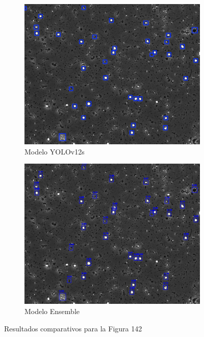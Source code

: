 \documentclass[12pt,a4paper,onecolumn,oneside]{report}
\begin{document}
\begin{figure}[H]
  \vspace{0.3cm} 
  
  \begin{subfigure}[b]{0.48\textwidth}
    \centering
    \includegraphics[width=\textwidth]{figuras/evaluacion_cualitativa/142/142_v12.jpg}
    \caption{Modelo YOLOv12s}
    \label{fig:yolov12s_image_142}
  \end{subfigure}
  \hfill
  \begin{subfigure}[b]{0.48\textwidth}
    \centering
    \includegraphics[width=\textwidth]{figuras/evaluacion_cualitativa/142/142_ensemble.jpg}
    \caption{Modelo Ensemble}
    \label{fig:ensemble_image_142}
  \end{subfigure}
  
  \caption{Resultados comparativos para la Figura 142}
  \label{fig:142}
\end{figure}
\end{document}
